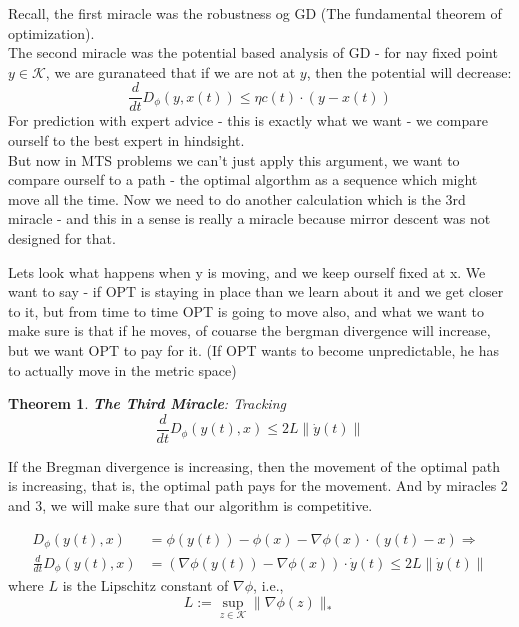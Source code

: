 \documentclass[11pt]{book} %
\newtheorem{theorem}{Theorem}[section]
\begin{document}
Recall, the first miracle was the robustness og GD (The fundamental theorem of optimization). \\
The second miracle was the potential based analysis of GD - for nay fixed point $y \in \mathcal{K}$,
we are guranateed that if we are not at $y$, then the potential will decrease: 
\[ 
    \frac{d}{dt} D_{\phi}(y, x(t)) \leq \eta c(t) \cdot (y - x(t))
\]
For prediction with expert advice - this is exactly what we want - we compare ourself to the best expert in hindsight. \\
But now in MTS problems we can't just apply this argument, we want to compare ourself to a path - the optimal algorthm as a 
sequence which might move all the time. 
Now we need to do another calculation which is the 3rd miracle - and this in a sense is really a miracle 
because mirror descent was not designed for that.

\bigbreak

Lets look what happens when y is moving, and we keep ourself fixed at x.
We want to say - if OPT is staying in place than we learn about it and we get closer to it,
but from time to time OPT is going to move also, and what we want to make sure is that if he moves, 
of couarse the bergman divergence will increase, but we want OPT to pay for it. 
(If OPT wants to become unpredictable, he has to actually move in the metric space)

\begin{boxA}
    \begin{theorem}{\textbf{The Third Miracle}: Tracking} \\

        \begin{equation*}
            \frac{d}{dt} D_{\phi}(y(t), x) \leq 2L \| \dot{y}(t) \|
        \end{equation*}

    \end{theorem}
\end{boxA}

If the Bregman divergence is increasing, then the movement of the optimal path is increasing, 
that is, the optimal path pays for the movement. And by miracles 2 and 3,
we will make sure that our algorithm is competitive.

\medbreak 

\begin{align*}
    D_{\phi}(y(t), x) &= \phi(y(t)) - \phi(x) - \nabla \phi(x) \cdot  (y(t) - x) \Rightarrow \\
    \frac{d}{dt} D_{\phi}(y(t), x) &=  (\nabla \phi(y(t)) - \nabla \phi(x)) \cdot \dot{y}(t) \leq 
    2L \| \dot{y}(t) \|
\end{align*}
where $L$ is the Lipschitz constant of $\nabla \phi$, i.e.,
\[
  L := \sup_{z \in \mathcal{K}} \| \nabla \phi(z) \|_*
\]
\end{document}
